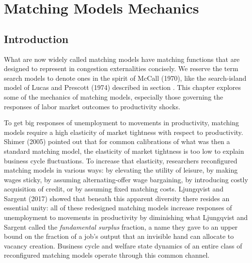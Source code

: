
%


%
%
\def\lege{\raise.3ex\hbox{$>$\kern-.75em\lower1ex\hbox{$<$}}}

\chapter{Matching Models Mechanics\label{mechanics_matching}}


\section{Introduction}

What are now widely called matching models  have   matching
functions that are designed to represent in congestion externalities concisely. We reserve  the term search models to denote ones in the spirit of McCall (1970), like the search-island
model of Lucas and Prescott (1974) described in
section .
This chapter explores some of the mechanics of
matching models, especially those governing the responses of labor market outcomes to productivity shocks.



 To get big responses of unemployment to movements
in productivity, matching models require a high elasticity of market
tightness %
with respect to
productivity.  Shimer (2005) pointed out  that
for common calibrations of what was then a standard matching model, the elasticity
of market tightness is too low to explain business cycle fluctuations.
To increase that elasticity, researchers  reconfigured
matching models in various ways:  by elevating the utility
of leisure, by making wages sticky, by assuming alternating-offer wage
bargaining, by introducing costly acquisition of credit, or by
assuming fixed matching costs.  Ljungqvist and Sargent (2017) showed that beneath this apparent
diversity there resides an essential unity: all of these redesigned  matching models increase responses of
unemployment to movements in productivity by diminishing what Ljungqvist and Sargent called the
{\it fundamental surplus} fraction, a name they gave  to an upper bound
on the fraction of a job's output that an invisible hand
can allocate to vacancy creation. Business cycle and
welfare state dynamics of an entire class of reconfigured matching
models  operate through this common channel.


